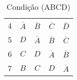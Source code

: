 \documentclass{article}
\begin{document}
\begin{resolution}
\begin{center}
\begin{minipage}{0.45\linewidth}
\begin{table}[H]
\begin{tabular}[]{c|cccc}
                4 & $\overline{A}$ & $\overline{B}$ & $\overline{C}$ & $\overline{D}$\\
                5 & $D$            & $\overline{A}$ & $\overline{B}$ & $\overline{C}$\\
                6 & $C$            & $D$            & $\overline{A}$ & $\overline{B}$\\
                7 & $B$            & $C$            & $D$            & $\overline{A}$\\\hline
            \end{tabular}\caption{Condição (ABCD)}
            \end{table}
        \end{minipage}
        \end{center}
    \end{resolution}

\newpage
\end{document}
